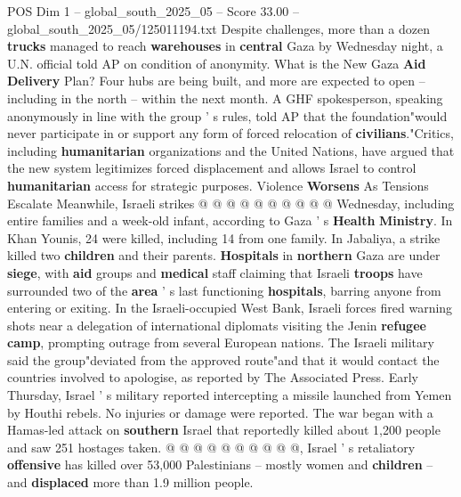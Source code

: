\begin{textsample}{POS Dim 1 – global\_south\_2025\_05 – Score 33.00 – global\_south\_2025\_05/125011194.txt}
Despite challenges, more than a dozen \textbf{trucks} managed to reach \textbf{warehouses} in \textbf{central} Gaza by Wednesday night, a U.N. official told AP on condition of anonymity.
What is the New Gaza \textbf{Aid} \textbf{Delivery} Plan?
Four hubs are being built, and more are expected to open -- including in the north -- within the next month.
A GHF spokesperson, speaking anonymously in line with the group ' s rules, told AP that the foundation"would never participate in or support any form of forced relocation of \textbf{civilians}."Critics, including \textbf{humanitarian} organizations and the United Nations, have argued that the new system legitimizes forced displacement and allows Israel to control \textbf{humanitarian} access for strategic purposes.
Violence \textbf{Worsens} As Tensions Escalate Meanwhile, Israeli strikes @ @ @ @ @ @ @ @ @ @ Wednesday, including entire families and a week-old infant, according to Gaza ' s \textbf{Health} \textbf{Ministry}.
In Khan Younis, 24 were killed, including 14 from one family.
In Jabaliya, a strike killed two \textbf{children} and their parents. \textbf{Hospitals} in \textbf{northern} Gaza are under \textbf{siege}, with \textbf{aid} groups and \textbf{medical} staff claiming that Israeli \textbf{troops} have surrounded two of the \textbf{area} ' s last functioning \textbf{hospitals}, barring anyone from entering or exiting.
In the Israeli-occupied West Bank, Israeli forces fired warning shots near a delegation of international diplomats visiting the Jenin \textbf{refugee} \textbf{camp}, prompting outrage from several European nations.
The Israeli military said the group"deviated from the approved route"and that it would contact the countries involved to apologise, as reported by The Associated Press.
Early Thursday, Israel ' s military reported intercepting a missile launched from Yemen by Houthi rebels.
No injuries or damage were reported.
The war began with a Hamas-led attack on \textbf{southern} Israel that reportedly killed about 1,200 people and saw 251 hostages taken. @ @ @ @ @ @ @ @ @ @, Israel ' s retaliatory \textbf{offensive} has killed over 53,000 Palestinians -- mostly women and \textbf{children} -- and \textbf{displaced} more than 1.9 million people.

\end{textsample}
